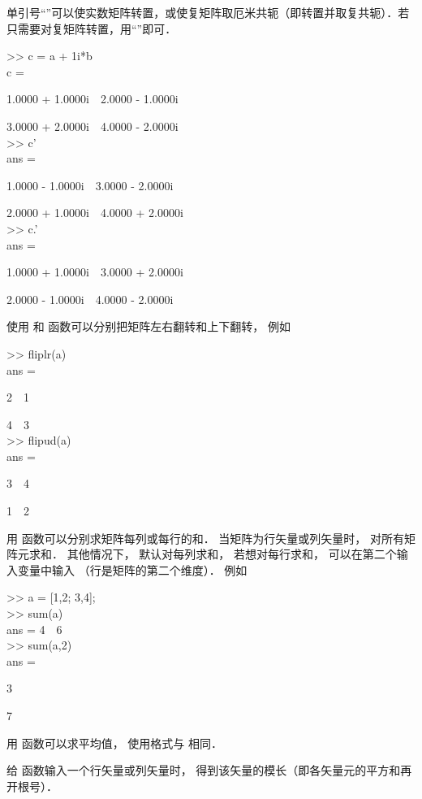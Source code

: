单引号“”可以使实数矩阵转置，或使复矩阵取厄米共轭（即转置并取复共轭）．若只需要对复矩阵转置，用“”即可．
\begin{Command}
>> c = a + 1i*b \\
c = \par
1.0000 + 1.0000i\ \ 2.0000 - 1.0000i \par
3.0000 + 2.0000i\ \ 4.0000 - 2.0000i \\
>> c' \\
ans = \par
1.0000 - 1.0000i\ \ 3.0000 - 2.0000i \par
2.0000 + 1.0000i\ \ 4.0000 + 2.0000i \\
>> c.' \\
ans = \par
1.0000 + 1.0000i\ \ 3.0000 + 2.0000i \par
2.0000 - 1.0000i\ \ 4.0000 - 2.0000i
\end{Command}
使用  和  函数可以分别把矩阵左右翻转和上下翻转， 例如
\begin{Command}
>> fliplr(a)\\
ans = \par
2\ \ 1\par
4\ \ 3\\
>> flipud(a)\\
ans = \par
3\ \ 4\par
1\ \ 2
\end{Command}

用  函数可以分别求矩阵每列或每行的和． 当矩阵为行矢量或列矢量时，  对所有矩阵元求和． 其他情况下，  默认对每列求和， 若想对每行求和， 可以在第二个输入变量中输入  （行是矩阵的第二个维度）． 例如
\begin{Command}
>> a = [1,2; 3,4];\\
>> sum(a)\\
ans = 4\ \ 6\\
>> sum(a,2)\\
ans =\par 3\par 7
\end{Command}
用  函数可以求平均值， 使用格式与  相同．

给  函数输入一个行矢量或列矢量时， 得到该矢量的模长（即各矢量元的平方和再开根号）． 

